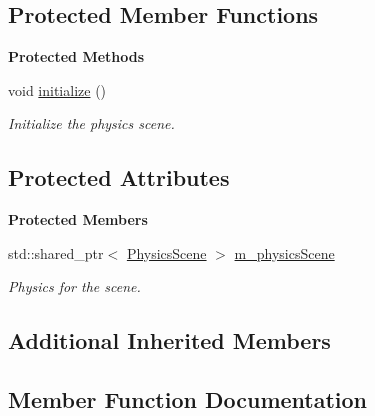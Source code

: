 \subsection*{Protected Member Functions}
\begin{Indent}\textbf{ Protected Methods}\par
\begin{DoxyCompactItemize}
\item 
\mbox{\label{classrev_1_1_physics_scene_component_abc0dc68ce86dcb75941c880300f3a23c}} 
void \mbox{\hyperlink{classrev_1_1_physics_scene_component_abc0dc68ce86dcb75941c880300f3a23c}{initialize}} ()
\begin{DoxyCompactList}\small\item\em Initialize the physics scene. \end{DoxyCompactList}\end{DoxyCompactItemize}
\end{Indent}
\subsection*{Protected Attributes}
\begin{Indent}\textbf{ Protected Members}\par
\begin{DoxyCompactItemize}
\item 
\mbox{\label{classrev_1_1_physics_scene_component_aeeec18612949109f391a2d6588af3d1d}} 
std\+::shared\+\_\+ptr$<$ \mbox{\hyperlink{classrev_1_1_physics_scene}{Physics\+Scene}} $>$ \mbox{\hyperlink{classrev_1_1_physics_scene_component_aeeec18612949109f391a2d6588af3d1d}{m\+\_\+physics\+Scene}}
\begin{DoxyCompactList}\small\item\em Physics for the scene. \end{DoxyCompactList}\end{DoxyCompactItemize}
\end{Indent}
\subsection*{Additional Inherited Members}


\subsection{Member Function Documentation}
\mbox{\label{classrev_1_1_physics_scene_component_a03e184a92a2fb3ed39f730e51c347cd4}} 
